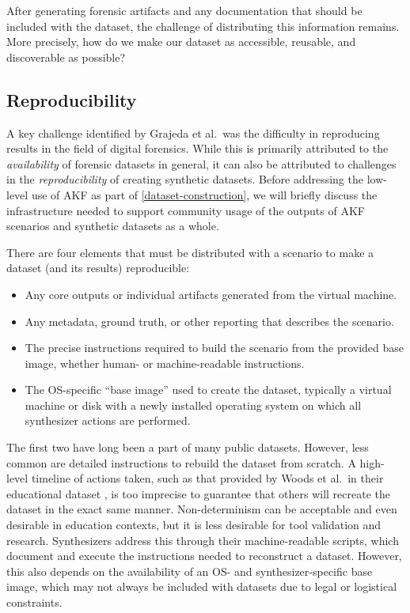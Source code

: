 \documentclass[final,5p,times,twocolumn]{elsarticle}
\begin{document}
After generating forensic artifacts and any documentation that should be
included with the dataset, the challenge of distributing this
information remains. More precisely, how do we make our dataset as
accessible, reusable, and discoverable as possible?

\subsection{Reproducibility}\label{reproducibility}

A key challenge identified by Grajeda et al.~was the difficulty in
reproducing results in the field of digital forensics. While this is
primarily attributed to the \emph{availability} of forensic datasets in
general, it can also be attributed to challenges in the
\emph{reproducibility} of creating synthetic datasets. Before addressing
the low-level use of AKF as part of \autoref{dataset-construction}, we
will briefly discuss the infrastructure needed to support community
usage of the outputs of AKF scenarios and synthetic datasets as a whole.

There are four elements that must be distributed with a scenario to make
a dataset (and its results) reproducible:

\begin{itemize}
\item
  Any core outputs or individual artifacts generated from the virtual
  machine.
\item
  Any metadata, ground truth, or other reporting that describes the
  scenario.
\item
  The precise instructions required to build the scenario from the
  provided base image, whether human- or machine-readable instructions.
\item
  The OS-specific ``base image'' used to create the dataset, typically a
  virtual machine or disk with a newly installed operating system on
  which all synthesizer actions are performed.
\end{itemize}

The first two have long been a part of many public datasets. However,
less common are detailed instructions to rebuild the dataset from
scratch. A high-level timeline of actions taken, such as that provided
by Woods et al.~in their educational dataset
\cite{woodsCreatingRealisticCorpora2011}, is too imprecise to
guarantee that others will recreate the dataset in the exact same
manner. Non-determinism can be acceptable and even desirable in
education contexts, but it is less desirable for tool validation and
research. Synthesizers address this through their machine-readable
scripts, which document and execute the instructions needed to
reconstruct a dataset. However, this also depends on the availability of
an OS- and synthesizer-specific base image, which may not always be
included with datasets due to legal or logistical constraints.
\end{document}
